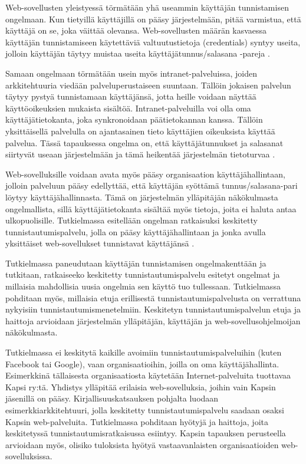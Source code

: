Web-sovellusten yleistyessä törmätään yhä useammin käyttäjän tunnistamisen ongelmaan. Kun tietyillä käyttäjillä on pääsy järjestelmään, pitää varmistua, että käyttäjä on se, joka väittää olevansa. Web-sovellusten määrän kasvaessa käyttäjän tunnistamiseen käytettäviä valtuutustietoja (credentials) syntyy useita, jolloin käyttäjän täytyy muistaa useita käyttäjätunnus/salasana -pareja \cite{billion_keys}.

Samaan ongelmaan törmätään usein myös intranet-palveluissa, joiden arkkitehtuuria viedään palveluperustaiseen suuntaan. Tällöin jokaisen palvelun täytyy pystyä tunnistamaan käyttäjänsä, jotta heille voidaan näyttää käyttöoikeuksien mukaista sisältöä. Intranet-palveluilla voi olla oma käyttäjätietokanta, joka synkronoidaan päätietokannan kanssa. Tällöin yksittäisellä palvelulla on ajantasainen tieto käyttäjien oikeuksista käyttää palvelua. Tässä tapauksessa ongelma on, että käyttäjätunnukset ja salasanat siirtyvät useaan järjestelmään ja tämä heikentää järjestelmän tietoturvaa \cite{nisti}.

Web-sovelluksille voidaan avata myös pääsy organisaation käyttäjähallintaan, jolloin palveluun pääsy edellyttää, että käyttäjän syöttämä tunnus/salasana-pari löytyy käyttäjähallinnasta. Tämä on järjestelmän ylläpitäjän näkökulmasta ongelmallista, sillä käyttäjätietokanta sisältää myös tietoja, joita ei haluta antaa ulkopuolisille. Tutkielmassa esitellään ongelman ratkaisuksi keskitetty tunnistautumispalvelu, jolla on pääsy käyttäjähallintaan ja jonka avulla yksittäiset web-sovellukset tunnistavat käyttäjänsä \cite{nisti}.

Tutkielmassa paneudutaan käyttäjän tunnistamisen ongelmakenttään ja tutkitaan, ratkaiseeko keskitetty tunnistautumispalvelu esitetyt ongelmat ja millaisia mahdollisia uusia ongelmia sen käyttö tuo tullessaan. Tutkielmassa pohditaan myös, millaisia etuja erillisestä tunnistautumispalvelusta on verrattuna nykyisiin tunnistautumismenetelmiin. Keskitetyn tunnistautumispalvelun etuja ja haittoja arvioidaan järjestelmän ylläpitäjän, käyttäjän ja web-sovellusohjelmoijan näkökulmasta.

Tutkielmassa ei keskitytä kaikille avoimiin tunnistautumispalveluihin (kuten Facebook tai Google), vaan organisaatioihin, joilla on oma käyttäjähallinta. Esimerkkinä tällaisesta organisaatiosta käytetään Internet-palveluita tuottavaa Kapsi ry:tä. Yhdistys ylläpitää erilaisia web-sovelluksia, joihin vain Kapsin jäsenillä on pääsy. Kirjallisuuskatsauksen pohjalta luodaan esimerkkiarkkitehtuuri, jolla keskitetty tunnistautumispalvelu saadaan osaksi Kapsin web-palveluita. Tutkielmassa pohditaan hyötyjä ja haittoja, joita keskitetyssä tunnistautumisratkaisussa esiintyy. Kapsin tapauksen perusteella arvioidaan myös, olisiko tuloksista hyötyä vastaavanlaisten organisaatioiden web-sovelluksissa.

